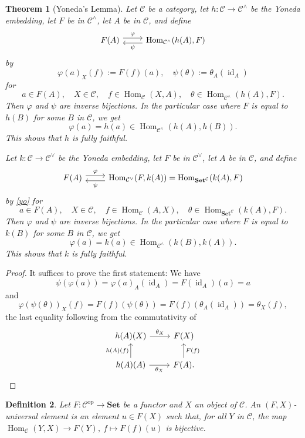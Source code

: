 \documentclass[12pt]{article}%
\newtheorem{thm}{Theorem}%
\newtheorem{df}[thm]{Definition}%
\theoremstyle{remark}
\theoremstyle{definition}
\newcommand{\C}{\mathcal C}
\newcommand{\Set}{\mathbf{Set}}
\newcommand{\pp}{\varphi}
\DeclareMathOperator{\id}{id}
\DeclareMathOperator{\Hom}{Hom}%
\DeclareMathOperator{\op}{op}
\begin{document}
\begin{thm}[Yoneda's Lemma]\label{yol}
Let $\C$ be a category, let $h:\C\to\C^\wedge$ be the Yoneda embedding, let $F$ be in $\C^\wedge$, let $A$ be in $\C$, and define 
$$
\begin{tikzcd} 
F(A)\ar[yshift=0.7ex]{r}{\varphi}&\Hom_{\C^\wedge}(h(A),F)\ar[yshift=-0.7ex]{l}{\psi}
\end{tikzcd}
$$
by 
\begin{equation}\label{yo}
\varphi(a)_X(f):=F(f)(a),\quad\psi(\theta):=\theta_A(\id_A)
\end{equation}
for 
$$
a\in F(A),\quad X\in\C,\quad f\in\Hom_\C(X,A),\quad\theta\in\Hom_{\C^\wedge}(h(A),F).
$$ 
Then $\varphi$ and $\psi$ are inverse bijections. In the particular case where $F$ is equal to $h(B)$ for some $B$ in $\C$, we get 
$$
\varphi(a)=h(a)\in\Hom_{\C^\wedge}(h(A),h(B)).
$$
This shows that $h$ is fully faithful.

Let $k:\C\to\C^\vee$ be the Yoneda embedding, let $F$ be in $\C^\vee$, let $A$ be in $\C$, and define 
$$
\begin{tikzcd} 
F(A)\ar[yshift=0.7ex]{r}{\varphi}&\Hom_{\C^\vee}(F,k(A))=\Hom_{\Set^\C}(k(A),F)\ar[yshift=-0.7ex]{l}{\psi}
\end{tikzcd}
$$
by \eqref{yo} for 
$$
a\in F(A),\quad X\in\C,\quad f\in\Hom_\C(A,X),\quad\theta\in\Hom_{\Set^\C}(k(A),F).
$$ 
Then $\varphi$ and $\psi$ are inverse bijections. In the particular case where $F$ is equal to $k(B)$ for some $B$ in $\C$, we get 
$$
\varphi(a)=k(a)\in\Hom_{\C^\wedge}(k(B),k(A)).
$$
This shows that $k$ is fully faithful.
\end{thm}
%
\begin{proof}
It suffices to prove the first statement: We have 
$$
\psi(\pp(a))=\pp(a)_A(\id_A)=F(\id_A)(a)=a
$$ 
and
$$
\pp(\psi(\theta))_X(f)=F(f)(\psi(\theta))=F(f)(\theta_A(\id_A))=\theta_X(f),
$$ 
the last equality following from the commutativity of 
$$
\begin{tikzcd}
h(A)(X)\ar{r}{\theta_X}&F(X)\\ 
h(A)(A)\ar{u}{h(A)(f)}\ar{r}[swap]{\theta_X}&F(A).\ar{u}[swap]{F(f)}
\end{tikzcd}
$$
\end{proof}
%
\begin{df}\label{ue} 
Let $F:\C^{\op}\to\Set$ be a functor and $X$ an object of $\C$. An $(F,X)$-{\em universal element}  is an element $u\in F(X)$ such that, for all $Y$ in $\C$, the map $\Hom_\C(Y,X)\to F(Y),\ f\mapsto F(f)(u)$ is bijective. 
\end{df}
\end{document}
